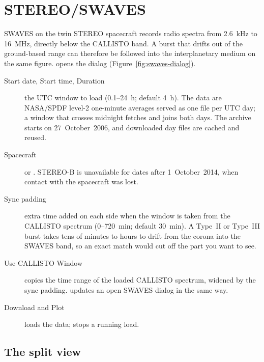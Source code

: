 \section{STEREO/SWAVES}
\label{sec:swaves}

SWAVES on the twin STEREO spacecraft \parencite{bougeret2008} records radio spectra from
2.6~kHz to 16~MHz, directly below the CALLISTO band. A burst that drifts out of the
ground-based range can therefore be followed into the interplanetary medium on the same
figure.  opens the  dialog (Figure~\ref{fig:swaves-dialog}).


\begin{description}
  \item[Start date, Start time, Duration] the UTC window to load (0.1--24~h; default
    4~h). The data are NASA/SPDF level-2 one-minute averages served as one file per UTC day;
    a window that crosses midnight fetches and joins both days. The archive starts on
    27~October~2006, and downloaded day files are cached and reused.
  \item[Spacecraft]  or . STEREO-B is
    unavailable for dates after 1~October~2014, when contact with the spacecraft was lost.
  \item[Sync padding] extra time added on each side when the window is taken from the
    CALLISTO spectrum (0--720~min; default 30~min). A Type~II or Type~III burst takes tens
    of minutes to hours to drift from the corona into the SWAVES band, so an exact match
    would cut off the part you want to see.
  \item[Use CALLISTO Window] copies the time range of the loaded CALLISTO spectrum, widened
    by the sync padding.  updates an open
    SWAVES dialog in the same way.
  \item[Download and Plot] loads the data;  stops a running load.
\end{description}

\subsection{The split view}
\label{sec:swaves-split}

